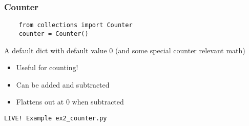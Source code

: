 \documentclass{beamer}
\begin{document}
\begin{frame}[fragile]
  \frametitle{Counter}
  \begin{verbatim}
    from collections import Counter
    counter = Counter()
  \end{verbatim}
  \begin{block}{\vspace*{-3ex}}
    A default dict with default value 0 (and some special counter
    relevant math)
  \end{block}
  \begin{itemize}
  \item Useful for counting!
  \item Can be added and subtracted
  \item Flattens out at 0 when subtracted
  \end{itemize}
  \begin{center}
    \texttt{LIVE! Example ex2\_counter.py}
  \end{center}
\end{frame}

\end{document}
